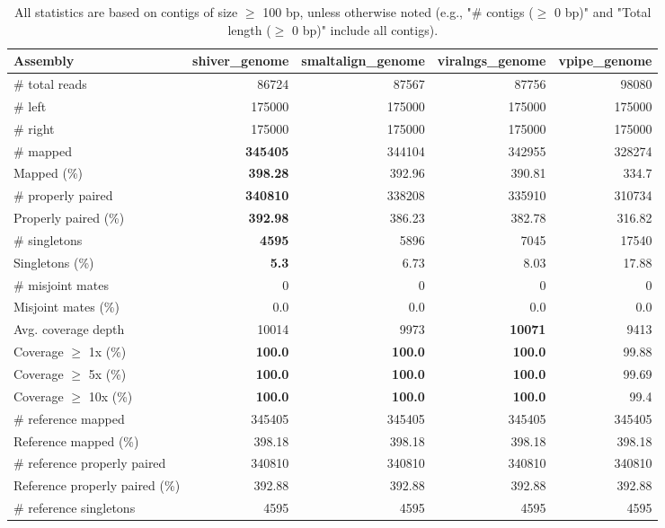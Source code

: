 \documentclass[12pt,a4paper]{article}
\begin{document}
\begin{table}[ht]
\begin{center}
\caption{All statistics are based on contigs of size $\geq$ 100 bp, unless otherwise noted (e.g., "\# contigs ($\geq$ 0 bp)" and "Total length ($\geq$ 0 bp)" include all contigs).}
\begin{tabular}{|l*{4}{|r}|}
\hline
Assembly & shiver\_genome & smaltalign\_genome & viralngs\_genome & vpipe\_genome \\ \hline
\# total reads & 86724 & 87567 & 87756 & 98080 \\ \hline
\# left & 175000 & 175000 & 175000 & 175000 \\ \hline
\# right & 175000 & 175000 & 175000 & 175000 \\ \hline
\# mapped & {\bf 345405} & 344104 & 342955 & 328274 \\ \hline
Mapped (\%) & {\bf 398.28} & 392.96 & 390.81 & 334.7 \\ \hline
\# properly paired & {\bf 340810} & 338208 & 335910 & 310734 \\ \hline
Properly paired (\%) & {\bf 392.98} & 386.23 & 382.78 & 316.82 \\ \hline
\# singletons & {\bf 4595} & 5896 & 7045 & 17540 \\ \hline
Singletons (\%) & {\bf 5.3} & 6.73 & 8.03 & 17.88 \\ \hline
\# misjoint mates & 0 & 0 & 0 & 0 \\ \hline
Misjoint mates (\%) & 0.0 & 0.0 & 0.0 & 0.0 \\ \hline
Avg. coverage depth & 10014 & 9973 & {\bf 10071} & 9413 \\ \hline
Coverage $\geq$ 1x (\%) & {\bf 100.0} & {\bf 100.0} & {\bf 100.0} & 99.88 \\ \hline
Coverage $\geq$ 5x (\%) & {\bf 100.0} & {\bf 100.0} & {\bf 100.0} & 99.69 \\ \hline
Coverage $\geq$ 10x (\%) & {\bf 100.0} & {\bf 100.0} & {\bf 100.0} & 99.4 \\ \hline
\# reference mapped & 345405 & 345405 & 345405 & 345405 \\ \hline
Reference mapped (\%) & 398.18 & 398.18 & 398.18 & 398.18 \\ \hline
\# reference properly paired & 340810 & 340810 & 340810 & 340810 \\ \hline
Reference properly paired (\%) & 392.88 & 392.88 & 392.88 & 392.88 \\ \hline
\# reference singletons & 4595 & 4595 & 4595 & 4595 \\ \hline

\end{tabular}
\end{center}
\end{table}
\end{document}
